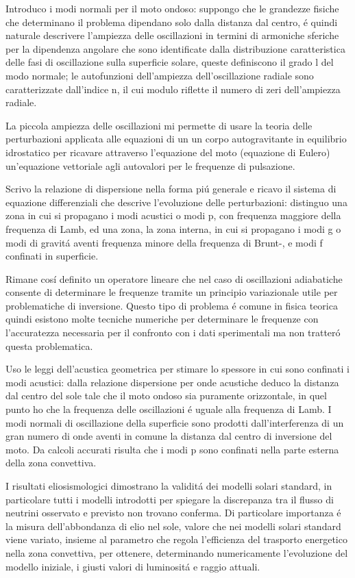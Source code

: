 Introduco i modi normali per il moto ondoso: suppongo che le grandezze fisiche che determinano il problema dipendano solo dalla distanza dal centro, \'e quindi naturale descrivere l'ampiezza delle oscillazioni  in termini di armoniche sferiche per la dipendenza angolare che sono identificate dalla distribuzione caratteristica delle fasi di oscillazione sulla superficie solare, queste definiscono il grado l del modo normale; le autofunzioni dell'ampiezza dell'oscillazione radiale sono caratterizzate dall'indice n, il cui modulo riflette il numero di zeri dell'ampiezza radiale.


La piccola ampiezza delle oscillazioni mi permette di usare la teoria delle perturbazioni applicata alle equazioni di un un corpo autogravitante in equilibrio idrostatico per ricavare attraverso l'equazione del moto (equazione di Eulero) un'equazione vettoriale agli autovalori per le frequenze di pulsazione. 

Scrivo la relazione di dispersione nella forma pi\'u generale e ricavo il sistema di equazione differenziali che descrive l'evoluzione delle perturbazioni: distinguo una zona in cui si propagano i modi acustici o modi p, con frequenza maggiore della frequenza di Lamb, ed una zona, la zona interna, in cui si propagano i modi g o modi di gravit\'a aventi frequenza minore della frequenza di Brunt-\vai{}, e modi f confinati in superficie. 

Rimane cos\'i definito un operatore lineare che nel caso di oscillazioni adiabatiche consente di determinare le frequenze tramite un principio variazionale utile per problematiche di inversione. Questo tipo di problema \'e comune in fisica teorica quindi esistono molte tecniche numeriche per determinare le frequenze con l'accuratezza necessaria per il confronto con i dati sperimentali ma non tratter\'o questa problematica.

Uso le leggi dell'acustica geometrica per stimare lo spessore in cui sono confinati i modi acustici: dalla relazione dispersione per onde acustiche deduco la distanza dal centro del sole tale che il moto ondoso sia puramente orizzontale, in quel punto ho che la frequenza delle oscillazioni \'e uguale alla frequenza di Lamb. I modi normali di oscillazione della superficie sono prodotti dall'interferenza di un gran numero di onde aventi in comune la distanza dal centro di inversione del moto. Da calcoli accurati risulta che i modi p sono confinati nella parte esterna della zona convettiva. 

I risultati eliosismologici dimostrano la validit\'a dei modelli solari standard, in particolare tutti i modelli introdotti per spiegare la discrepanza tra il flusso di neutrini osservato e previsto non trovano conferma. Di particolare importanza \'e la  misura  dell'abbondanza di elio nel sole, valore che nei modelli solari standard viene variato, insieme al parametro che regola l'efficienza del trasporto energetico nella zona convettiva, per ottenere, determinando numericamente l'evoluzione del modello iniziale, i giusti valori di luminosit\'a e raggio attuali.

